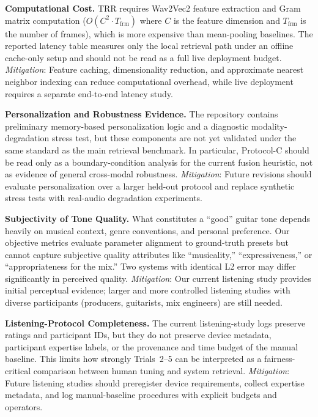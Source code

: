 \textbf{Computational Cost.} TRR requires Wav2Vec2 feature extraction and Gram matrix computation ($O(C^2 \cdot T_{\text{frm}})$ where $C$ is the feature dimension and $T_{\text{frm}}$ is the number of frames), which is more expensive than mean-pooling baselines. The reported latency table measures only the local retrieval path under an offline cache-only setup and should not be read as a full live deployment budget. \textit{Mitigation}: Feature caching, dimensionality reduction, and approximate nearest neighbor indexing can reduce computational overhead, while live deployment requires a separate end-to-end latency study.

\textbf{Personalization and Robustness Evidence.} The repository contains preliminary memory-based personalization logic and a diagnostic modality-degradation stress test, but these components are not yet validated under the same standard as the main retrieval benchmark. In particular, Protocol-C should be read only as a boundary-condition analysis for the current fusion heuristic, not as evidence of general cross-modal robustness. \textit{Mitigation}: Future revisions should evaluate personalization over a larger held-out protocol and replace synthetic stress tests with real-audio degradation experiments.

\textbf{Subjectivity of Tone Quality.} What constitutes a ``good'' guitar tone depends heavily on musical context, genre conventions, and personal preference. Our objective metrics evaluate parameter alignment to ground-truth presets but cannot capture subjective quality attributes like ``musicality,'' ``expressiveness,'' or ``appropriateness for the mix.'' Two systems with identical L2 error may differ significantly in perceived quality. \textit{Mitigation}: Our current listening study provides initial perceptual evidence; larger and more controlled listening studies with diverse participants (producers, guitarists, mix engineers) are still needed.

\textbf{Listening-Protocol Completeness.} The current listening-study logs preserve ratings and participant IDs, but they do not preserve device metadata, participant expertise labels, or the provenance and time budget of the manual baseline. This limits how strongly Trials~2--5 can be interpreted as a fairness-critical comparison between human tuning and system retrieval. \textit{Mitigation}: Future listening studies should preregister device requirements, collect expertise metadata, and log manual-baseline procedures with explicit budgets and operators.


